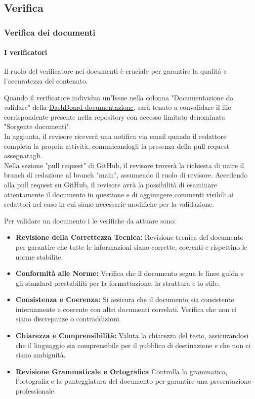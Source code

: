\documentclass{article}
\begin{document}
\subsection{Verifica}
\subsubsection{Verifica dei documenti}
\paragraph{I verificatori}\label{sec:verificatori}

    Il ruolo del verificatore nei documenti è cruciale per garantire la qualità e l'accuratezza del contenuto.

Quando il verificatore individua un'Issue nella colonna "Documentazione da validare" della  \href{https://github.com/orgs/ByteOps-swe/projects/1/views/1}{DashBoard documentazione}, sarà tenuto a convalidare il file corrispondente presente nella repository con accesso limitato denominata "Sorgente documenti". \\
In aggiunta, il revisore riceverà una notifica via email quando il redattore completa la propria attività, comunicandogli la presenza della pull request assegnatagli.\\
Nella sezione "pull request" di GitHub, il revisore troverà la richiesta di unire il branch di redazione al branch "main", assumendo il ruolo di revisore. Accedendo alla pull request su GitHub, il revisore avrà la possibilità di esaminare attentamente il documento in questione e di aggiungere commenti visibili ai redattori nel caso in cui siano necessarie modifiche per la validazione.

\vspace{0.3cm}

Per validare un documento i le verifiche da attuare sono:
\begin{itemize}
    \item \textbf{Revisione della Correttezza Tecnica:} Revisione tecnica del documento per garantire che tutte le informazioni siano corrette, coerenti e rispettino le norme stabilite.
     \item \textbf{Conformità alle Norme:} Verifica che il documento segua le linee guida e gli standard prestabiliti per la formattazione, la struttura e lo stile.
      \item \textbf{Consistenza e Coerenza:} Si assicura che il documento sia consistente internamente e coerente con altri documenti correlati. Verifica che non ci siano discrepanze o contraddizioni.
      \item \textbf{Chiarezza e Comprensibilità:} Valuta la chiarezza del testo, assicurandosi che il linguaggio sia comprensibile per il pubblico di destinazione e che non ci siano ambiguità.
      \item \textbf{Revisione Grammaticale e Ortografica} Controlla la grammatica, l'ortografia e la punteggiatura del documento per garantire una presentazione professionale.
\end{itemize}
\end{document}
